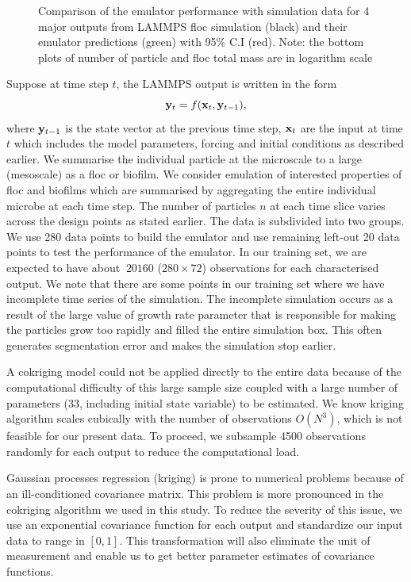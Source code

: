 \begin{figure}[!ht]
\begin{subfigure}[b]{.60\textwidth}
\end{subfigure}\vspace*{-.5em}
\caption[]{Comparison of the emulator performance with simulation data for 4 major outputs from LAMMPS floc simulation (black) and their emulator predictions (green) with 95\% C.I (red). Note: the bottom plots of number of particle and floc total mass are in logarithm scale}\label{ress1}
\end{figure}

Suppose at time step $t$, the LAMMPS output is written in the form 
\begin{equation}
{\bf y}_t=f({\bf x}_t,{\bf y}_{t-1}),
\end{equation}
where ${\bf y}_{t-1}$ is the state vector at the previous time step, ${\bf x}_t$ are the input at time $t$ which includes the model parameters, forcing and initial conditions as described earlier. We summarise the individual particle at the microscale to a large (mesoscale) as a floc or biofilm. We consider emulation of interested properties of floc and biofilms which are summarised by aggregating the entire individual microbe at each time step. The number of particles $n$ at each time slice varies across the design points as stated earlier. The data is subdivided into two groups. We use 280 data points to build the emulator and use remaining left-out 20 data points to test the performance of the emulator. 
In our training set, we are expected to have about $~20160$ ($280\times 72$) observations for each characterised output. We note that there are some points in our training set where we have incomplete time series of the simulation. The incomplete simulation occurs as a result of the large value of growth rate parameter that is responsible for making the particles grow too rapidly and filled the entire simulation box. This often generates segmentation error and makes the simulation stop earlier. 

A cokriging model could not be applied directly to the entire data because of the computational difficulty of this large sample size coupled with a large number of parameters (33, including initial state variable) to be estimated. We know kriging algorithm scales cubically with the number of observations $O(N^3)$, which is not feasible for our present data. To proceed, we subsample 4500 observations randomly for each output to reduce the computational load. 

Gaussian processes regression (kriging) is prone to numerical problems because of an ill-conditioned covariance matrix. This problem is more pronounced in the cokriging algorithm we used in this study. To reduce the severity of this issue,  we use an exponential covariance function for each output and standardize our input data to range in $[0,1]$.  This transformation will also eliminate the unit of measurement and enable us to get better parameter estimates of covariance functions. 

